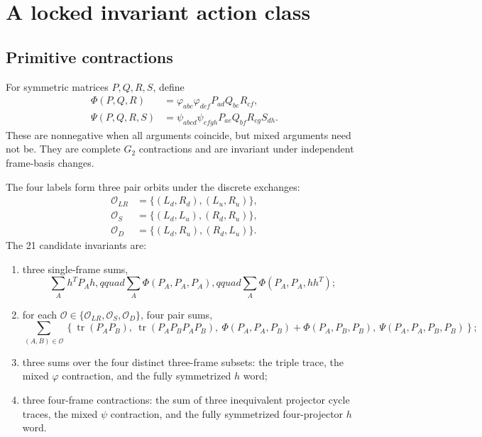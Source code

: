 \documentclass[11pt]{article}
\newcommand{\tr}{\operatorname{tr}}
\begin{document}
\section{A locked invariant action class}

\subsection{Primitive contractions}

For symmetric matrices $P,Q,R,S$, define
\begin{align}
  \Phi(P,Q,R)
  &=\varphi_{abc}\varphi_{def}P_{ad}Q_{be}R_{cf},
  \label{eq:PhiProj}\\
  \Psi(P,Q,R,S)
  &=\psi_{abcd}\psi_{efgh}P_{ae}Q_{bf}R_{cg}S_{dh}.
  \label{eq:PsiProj}
\end{align}
These are nonnegative when all arguments coincide, but mixed arguments need not be.  They are complete $G_2$ contractions and are invariant under independent frame-basis changes.

The four labels form three pair orbits under the discrete exchanges:
\begin{align}
  \mathcal O_{LR}&=\{(L_d,R_d),(L_u,R_u)\},\\
  \mathcal O_{S}&=\{(L_d,L_u),(R_d,R_u)\},\\
  \mathcal O_{D}&=\{(L_d,R_u),(R_d,L_u)\}.
\end{align}
The 21 candidate invariants are:
\begin{enumerate}[label=\arabic*.,leftmargin=2.2em]
  \item three single-frame sums,
  \begin{equation}
    \sum_A h^TP_Ah,qquad
    \sum_A\Phi(P_A,P_A,P_A),qquad
    \sum_A\Phi(P_A,P_A,hh^T);
  \end{equation}
  \item for each $\mathcal O\in\{\mathcal O_{LR},\mathcal O_S,\mathcal O_D\}$, four pair sums,
  \begin{equation}
  \sum_{(A,B)\in\mathcal O}
  \left\{
  \tr(P_AP_B),\ \tr(P_AP_BP_AP_B),\
  \Phi(P_A,P_A,P_B)+\Phi(P_A,P_B,P_B),\
  \Psi(P_A,P_A,P_B,P_B)
  \right\};
  \end{equation}
  \item three sums over the four distinct three-frame subsets: the triple trace, the mixed $\varphi$ contraction, and the fully symmetrized $h$ word;
  \item three four-frame contractions: the sum of three inequivalent projector cycle traces, the mixed $\psi$ contraction, and the fully symmetrized four-projector $h$ word.
\end{enumerate}
\end{document}

